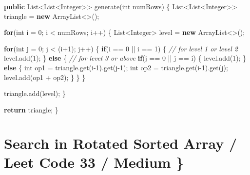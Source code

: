 \documentclass[]{book}
\newenvironment{Shaded}{\begin{snugshade}}{\end{snugshade}}
\newcommand{\BuiltInTok}[1]{#1}
\newcommand{\CommentTok}[1]{\textcolor[rgb]{0.56,0.35,0.01}{\textit{#1}}}
\newcommand{\DataTypeTok}[1]{\textcolor[rgb]{0.13,0.29,0.53}{#1}}
\newcommand{\DecValTok}[1]{\textcolor[rgb]{0.00,0.00,0.81}{#1}}
\newcommand{\FunctionTok}[1]{\textcolor[rgb]{0.00,0.00,0.00}{#1}}
\newcommand{\KeywordTok}[1]{\textcolor[rgb]{0.13,0.29,0.53}{\textbf{#1}}}
\newcommand{\NormalTok}[1]{#1}
\begin{document}
\begin{Shaded}
\begin{Highlighting}[]
\KeywordTok{public} \BuiltInTok{List}\NormalTok{<}\BuiltInTok{List}\NormalTok{<}\BuiltInTok{Integer}\NormalTok{>> }\FunctionTok{generate}\NormalTok{(}\DataTypeTok{int}\NormalTok{ numRows) \{}
    \BuiltInTok{List}\NormalTok{<}\BuiltInTok{List}\NormalTok{<}\BuiltInTok{Integer}\NormalTok{>> triangle = }\KeywordTok{new} \BuiltInTok{ArrayList}\NormalTok{<>();}

    \KeywordTok{for}\NormalTok{(}\DataTypeTok{int}\NormalTok{ i = }\DecValTok{0}\NormalTok{; i < numRows; i++) \{}
        \BuiltInTok{List}\NormalTok{<}\BuiltInTok{Integer}\NormalTok{> level = }\KeywordTok{new} \BuiltInTok{ArrayList}\NormalTok{<>();}

        \KeywordTok{for}\NormalTok{(}\DataTypeTok{int}\NormalTok{ j = }\DecValTok{0}\NormalTok{; j < (i+}\DecValTok{1}\NormalTok{); j++) \{}
            \KeywordTok{if}\NormalTok{(i == }\DecValTok{0}\NormalTok{ || i == }\DecValTok{1}\NormalTok{) \{}
                \CommentTok{// for level 1 or level 2}
\NormalTok{                level.}\FunctionTok{add}\NormalTok{(}\DecValTok{1}\NormalTok{);}
\NormalTok{            \} }\KeywordTok{else}\NormalTok{ \{}
                \CommentTok{// for level 3 or above}
                \KeywordTok{if}\NormalTok{(j == }\DecValTok{0}\NormalTok{ || j == i) \{}
\NormalTok{                    level.}\FunctionTok{add}\NormalTok{(}\DecValTok{1}\NormalTok{);}
\NormalTok{                \} }\KeywordTok{else}\NormalTok{ \{}
                    \DataTypeTok{int}\NormalTok{ op1 = triangle.}\FunctionTok{get}\NormalTok{(i}\DecValTok{-1}\NormalTok{).}\FunctionTok{get}\NormalTok{(j}\DecValTok{-1}\NormalTok{);}
                    \DataTypeTok{int}\NormalTok{ op2 = triangle.}\FunctionTok{get}\NormalTok{(i}\DecValTok{-1}\NormalTok{).}\FunctionTok{get}\NormalTok{(j);}
\NormalTok{                    level.}\FunctionTok{add}\NormalTok{(op1 + op2);}
\NormalTok{                \}}
\NormalTok{            \}}
\NormalTok{        \}}

\NormalTok{        triangle.}\FunctionTok{add}\NormalTok{(level);}
\NormalTok{    \}}

    \KeywordTok{return}\NormalTok{ triangle;}
\NormalTok{\}}
\end{Highlighting}
\end{Shaded}

\hypertarget{search-in-rotated-sorted-array-leet-code-33-medium}{%
\section{Search in Rotated Sorted Array / Leet Code 33 / Medium \}}\label{search-in-rotated-sorted-array-leet-code-33-medium}}
\end{document}
